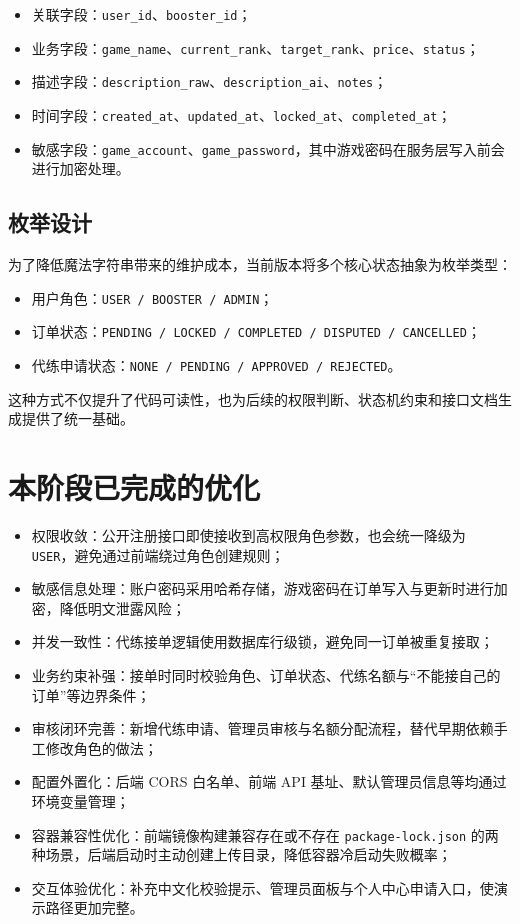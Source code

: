 ﻿\documentclass[12pt,a4paper]{ctexart}
\begin{document}
\begin{itemize}[leftmargin=2em]
  \item 关联字段：\texttt{user\_id}、\texttt{booster\_id}；
  \item 业务字段：\texttt{game\_name}、\texttt{current\_rank}、\texttt{target\_rank}、\texttt{price}、\texttt{status}；
  \item 描述字段：\texttt{description\_raw}、\texttt{description\_ai}、\texttt{notes}；
  \item 时间字段：\texttt{created\_at}、\texttt{updated\_at}、\texttt{locked\_at}、\texttt{completed\_at}；
  \item 敏感字段：\texttt{game\_account}、\texttt{game\_password}，其中游戏密码在服务层写入前会进行加密处理。
\end{itemize}

\subsection{枚举设计}
为了降低魔法字符串带来的维护成本，当前版本将多个核心状态抽象为枚举类型：

\begin{itemize}[leftmargin=2em]
  \item 用户角色：\texttt{USER / BOOSTER / ADMIN}；
  \item 订单状态：\texttt{PENDING / LOCKED / COMPLETED / DISPUTED / CANCELLED}；
  \item 代练申请状态：\texttt{NONE / PENDING / APPROVED / REJECTED}。
\end{itemize}

这种方式不仅提升了代码可读性，也为后续的权限判断、状态机约束和接口文档生成提供了统一基础。

\section{本阶段已完成的优化}

\begin{itemize}[leftmargin=2em]
  \item 权限收敛：公开注册接口即使接收到高权限角色参数，也会统一降级为 \texttt{USER}，避免通过前端绕过角色创建规则；
  \item 敏感信息处理：账户密码采用哈希存储，游戏密码在订单写入与更新时进行加密，降低明文泄露风险；
  \item 并发一致性：代练接单逻辑使用数据库行级锁，避免同一订单被重复接取；
  \item 业务约束补强：接单时同时校验角色、订单状态、代练名额与“不能接自己的订单”等边界条件；
  \item 审核闭环完善：新增代练申请、管理员审核与名额分配流程，替代早期依赖手工修改角色的做法；
  \item 配置外置化：后端 CORS 白名单、前端 API 基址、默认管理员信息等均通过环境变量管理；
  \item 容器兼容性优化：前端镜像构建兼容存在或不存在 \texttt{package-lock.json} 的两种场景，后端启动时主动创建上传目录，降低容器冷启动失败概率；
  \item 交互体验优化：补充中文化校验提示、管理员面板与个人中心申请入口，使演示路径更加完整。
\end{itemize}
\end{document}
